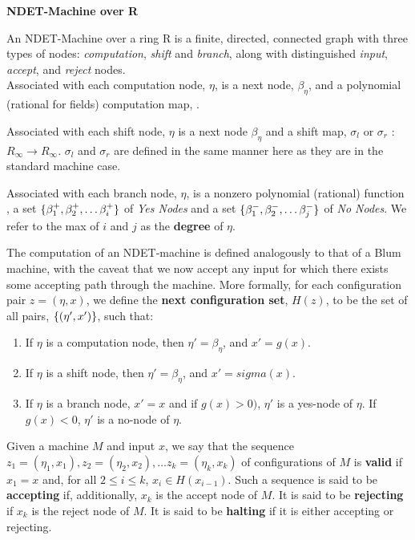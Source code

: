 \begin{definition} \textbf{NDET-Machine over R}

  An NDET-Machine over a ring R is a finite, directed, connected graph
  with three types of nodes: \emph{computation}, \emph{shift} and
  \emph{branch}, along with distinguished \emph{input}, \emph{accept}, 
  and \emph{reject} nodes.\\

  Associated with each computation node, $\eta$, is a next node,
  $\beta_{\eta}$, and a polynomial (rational for fields) computation
  map, .

  Associated with each shift node, $\eta$ is a next node $\beta_\eta$
  and a shift map, $\sigma_l$ or $\sigma_r$ : $R_\infty \rightarrow
  R_\infty$.  $\sigma_l$ and $\sigma_r$ are defined in the same manner
  here as they are in the standard machine case.

  Associated with each branch node, $\eta$, is a nonzero polynomial (rational)
  function , a set $\{\beta^+_1,
    \beta^+_2, \ldots \beta^+_i\}$ of \emph{Yes Nodes} and a set
  $\{\beta^-_1, \beta^-_2, \ldots \beta^-_j\}$ of \emph{No Nodes}.
  We refer to the max of $i$ and $j$ as the \textbf{degree} of $\eta$.
\end{definition}

The computation of an NDET-machine is defined analogously to that of a
Blum machine, with the caveat that we now accept any input for which
there exists some accepting path through the machine.  More formally,
for each configuration pair $z = (\eta, x)$, we define the
\textbf{next configuration set}, $H(z)$, to be the set of all pairs,
$\{(\eta', x')\}$, such that:

\begin{enumerate}
\item If $\eta$ is a computation node, then $\eta' = \beta_\eta$, and
  $x' = g(x)$.
\item If $\eta$ is a shift node, then $\eta' = \beta_\eta$, and
  $x' = sigma(x)$.
\item If $\eta$ is a branch node, $x' = x$ and if $g(x) > 0)$, $\eta'$
  is a yes-node of $\eta$.  If $g(x) < 0$, $\eta'$ is a no-node of
  $\eta$.
\end{enumerate}

Given a machine $M$ and input $x$, we say that the sequence $z_1 =
(\eta_1, x_1), z_2 = (\eta_2, x_2), \ldots z_k = (\eta_k, x_k)$ of
configurations of $M$ is \textbf{valid} if $x_1 = x$ and, for all $2
\leq i \leq k$, $x_i \in H(x_{i-1})$.  Such a sequence is said to be
\textbf{accepting} if, additionally, $x_k$ is the accept node of $M$.
It is said to be \textbf{rejecting} if $x_k$ is the reject node of
$M$.  It is said to be \textbf{halting} if it is either accepting or
rejecting.

